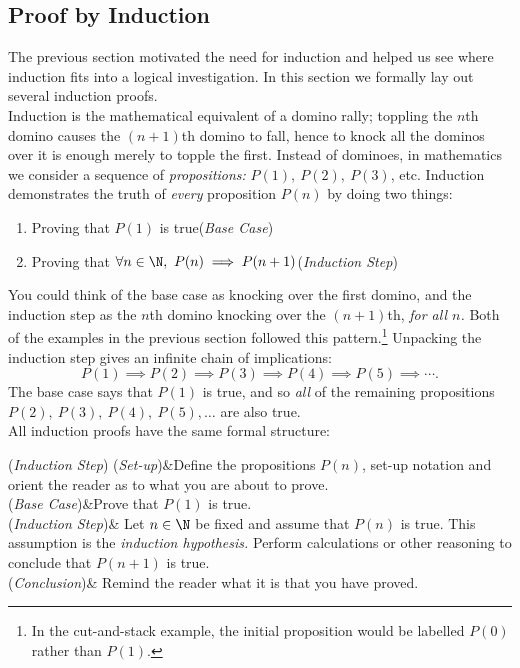 \subsection{Proof by Induction}

The previous section motivated the need for induction and helped us see where induction fits into a logical investigation. In this section we formally lay out several induction proofs.\\

Induction is the mathematical equivalent of a domino rally; toppling the $n$th domino causes the $(n+1)$th domino to fall, hence to knock all the dominos over it is enough merely to topple the first. Instead of dominoes, in mathematics we consider a sequence of \emph{propositions:} $P(1),\ P(2),\ P(3)$, etc. Induction demonstrates the truth of \emph{every} proposition $P(n)$ by doing two things:
\begin{enumerate}
  \item Proving that $P(1)$ is true\hfill(\emph{Base Case}) 
  \item Proving that $\forall n\in\N,\ P(n)\implies P(n+1)$\hfill(\emph{Induction Step})
\end{enumerate}
You could think of the base case as knocking over the first domino, and the induction step as the $n$th domino knocking over the $(n+1)$th, \emph{for all $n$.} Both of the examples in the previous section followed this pattern.\footnote{In the cut-and-stack example, the initial proposition would be labelled $P(0)$ rather than $P(1)$.} Unpacking the induction step gives an infinite chain of implications:
\[P(1)\implies P(2)\implies P(3)\implies P(4)\implies P(5)\implies \cdots.\]
The base case says that $P(1)$ is true, and so \emph{all} of the remaining propositions $P(2),\ P(3),\ P(4),\ P(5),\ldots$ are also true.\\

All induction proofs have the same formal structure:

\begin{ptabular}{(\emph{Induction Step})}
  (\emph{Set-up})&Define the propositions $P(n)$, set-up notation and orient the reader as to what you are about to prove.\\
	(\emph{Base Case})&Prove that $P(1)$ is true.\\
	(\emph{Induction Step})& Let $n\in\N$ be fixed and assume that $P(n)$ is true. This assumption is the \emph{induction hypothesis.} Perform calculations or other reasoning to conclude that $P(n+1)$ is true.\\
	(\emph{Conclusion})& Remind the reader what it is that you have proved.
\end{ptabular}\vspace{5pt}

